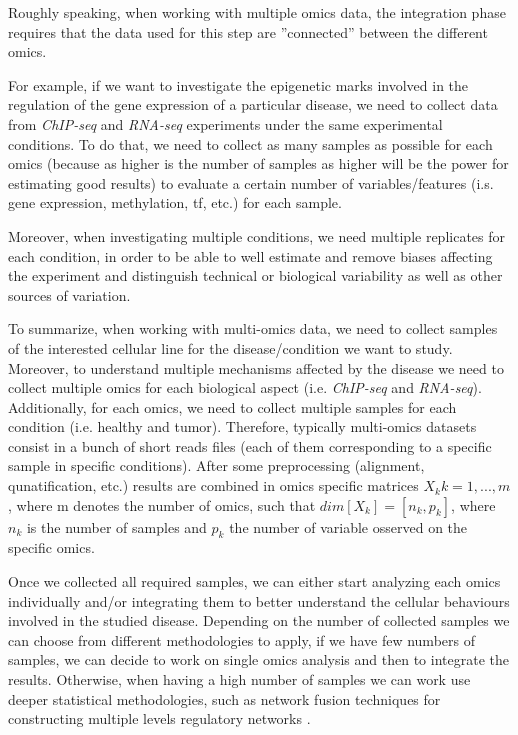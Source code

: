 Roughly speaking, when working with multiple omics data, the integration phase requires that the data used for this step are ''connected'' between the different omics.

For example, if we want to investigate the epigenetic marks involved in the regulation of the gene expression of a particular disease, we need to collect data from \textit{ChIP-seq} and \textit{RNA-seq} experiments under the same experimental conditions.
To do that, we need to collect as many samples as possible for each omics (because as higher is the number of samples as higher will be the power for estimating good results) to evaluate a certain number of variables/features (i.s. gene expression, methylation, \gls{tf}, etc.) for each sample.

Moreover, when investigating multiple conditions, we need multiple replicates for each condition, in order to be able to well estimate and remove biases affecting the experiment and distinguish technical or biological variability as well as other sources of variation.

To summarize, when working with multi-omics data, we need to collect samples of the interested cellular line for the disease/condition we want to study.
Moreover, to understand multiple mechanisms affected by the disease we need to collect multiple omics for each biological aspect (i.e. \textit{ChIP-seq} and \textit{RNA-seq}).
Additionally, for each omics, we need to collect multiple samples for each condition (i.e. healthy and tumor).
Therefore, typically multi-omics datasets consist in a bunch of short reads files (each of them corresponding to a specific sample in specific conditions). 
After some preprocessing (alignment, qunatification, etc.) results are combined in omics specific matrices $X_k k=1,...,m$, where m denotes the number of omics, such that $dim[X_k]=[n_k, p_k]$, where $n_k$ is the number of samples and $p_k$ the number of variable osserved on the specific omics.

Once we collected all required samples, we can either start analyzing each omics individually and/or integrating them to better understand the cellular behaviours involved in the studied disease.
Depending on the number of collected samples we can choose from different methodologies to apply, if we have few numbers of samples, we can decide to work on single omics analysis and then to integrate the results.
Otherwise, when having a high number of samples we can work use deeper statistical methodologies, such as network fusion techniques for constructing multiple levels regulatory networks \cite{Angelini2014c, Rohart2017, Argelaguet2018}.

